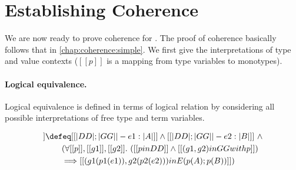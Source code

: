 \section{Establishing Coherence}

We are now ready to prove coherence for \fnamee. The proof of coherence
basically follows that in \cref{chap:coherence:simple}. We first give the
interpretations of type and value contexts ($[[p]]$ is a mapping from type
variables to monotypes).

\begin{definition}
\end{definition}


\begin{definition}
\end{definition}


\paragraph{Logical equivalence.}

Logical equivalence is defined in terms of logical relation by considering all possible interpretations of
free type and term variables.

\begin{definition}
  \begin{align*}
    [[DD ; GG |- e1 == e2 : A ; B]]  & \defeq  [[|DD| ; |GG| |- e1 : |A|]] \land [[ |DD | ; |GG| |- e2 : | B | ]] \ \land \\
                                       & \qquad (\forall [[p]], [[g1]], [[g2]]. \ ([[p in DD]] \land [[(g1, g2) in GG with p ]]) \\
                                       & \qquad \Longrightarrow [[(g1 (p1 (e1)), g2 (p2 (e2)))  in E (p(A) ; p(B)) ]])
  \end{align*}
\end{definition}


